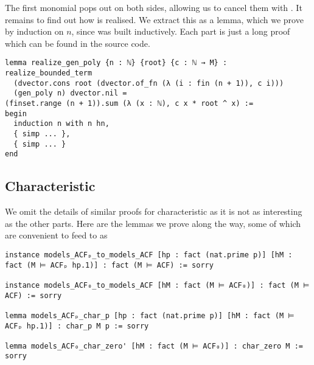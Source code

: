 The first monomial pops out on both sides,
allowing us to cancel them with .
It remains to find out how  is realised.
We extract this as a lemma,
which we prove by induction on $n$, since  was built inductively.
Each part is just a long  proof which can be found in the source code.

\begin{lstlisting}
lemma realize_gen_poly {n : ℕ} {root} {c : ℕ → M} :
realize_bounded_term
  (dvector.cons root (dvector.of_fn (λ (i : fin (n + 1)), c i)))
  (gen_poly n) dvector.nil =
(finset.range (n + 1)).sum (λ (x : ℕ), c x * root ^ x) :=
begin
  induction n with n hn,
  { simp ... },
  { simp ... }
end\end{lstlisting}

\subsection{Characteristic}

We omit the details of similar proofs for characteristic as it is not
as interesting as the other parts.
Here are the lemmas we prove along the way,
some of which are convenient to feed to  as 

\begin{lstlisting}
instance models_ACFₚ_to_models_ACF [hp : fact (nat.prime p)] [hM : fact (M ⊨ ACFₚ hp.1)] : fact (M ⊨ ACF) := sorry

instance models_ACF₀_to_models_ACF [hM : fact (M ⊨ ACF₀)] : fact (M ⊨ ACF) := sorry

lemma models_ACFₚ_char_p [hp : fact (nat.prime p)] [hM : fact (M ⊨ ACFₚ hp.1)] : char_p M p := sorry

lemma models_ACF₀_char_zero' [hM : fact (M ⊨ ACF₀)] : char_zero M := sorry

\end{lstlisting}
